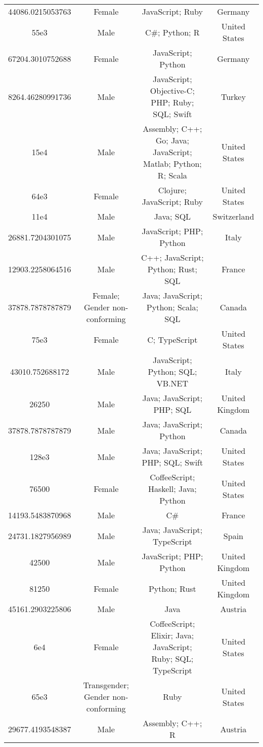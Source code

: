 \begin{center}
\begin{tabular}{ |c|c|c|c| }
44086.0215053763  &  Female  &  JavaScript; Ruby  &  Germany  \\ 
55e3  &  Male  &  C\#; Python; R  &  United States  \\ 
67204.3010752688  &  Female  &  JavaScript; Python  &  Germany  \\ 
8264.46280991736  &  Male  &  JavaScript; Objective-C; PHP; Ruby; SQL; Swift  &  Turkey  \\ 
15e4  &  Male  &  Assembly; C++; Go; Java; JavaScript; Matlab; Python; R; Scala  &  United States  \\ 
64e3  &  Female  &  Clojure; JavaScript; Ruby  &  United States  \\ 
11e4  &  Male  &  Java; SQL  &  Switzerland  \\ 
26881.7204301075  &  Male  &  JavaScript; PHP; Python  &  Italy  \\ 
12903.2258064516  &  Male  &  C++; JavaScript; Python; Rust; SQL  &  France  \\ 
37878.7878787879  &  Female; Gender non-conforming  &  Java; JavaScript; Python; Scala; SQL  &  Canada  \\ 
75e3  &  Female  &  C; TypeScript  &  United States  \\ 
43010.752688172  &  Male  &  JavaScript; Python; SQL; VB.NET  &  Italy  \\ 
26250  &  Male  &  Java; JavaScript; PHP; SQL  &  United Kingdom  \\ 
37878.7878787879  &  Male  &  Java; JavaScript; Python  &  Canada  \\ 
128e3  &  Male  &  Java; JavaScript; PHP; SQL; Swift  &  United States  \\ 
76500  &  Female  &  CoffeeScript; Haskell; Java; Python  &  United States  \\ 
14193.5483870968  &  Male  &  C\#  &  France  \\ 
24731.1827956989  &  Male  &  Java; JavaScript; TypeScript  &  Spain  \\ 
42500  &  Male  &  JavaScript; PHP; Python  &  United Kingdom  \\ 
81250  &  Female  &  Python; Rust  &  United Kingdom  \\ 
45161.2903225806  &  Male  &  Java  &  Austria  \\ 
6e4  &  Female  &  CoffeeScript; Elixir; Java; JavaScript; Ruby; SQL; TypeScript  &  United States  \\ 
65e3  &  Transgender; Gender non-conforming  &  Ruby  &  United States  \\ 
29677.4193548387  &  Male  &  Assembly; C++; R  &  Austria  \\ 

\end{tabular}
\end{center}
